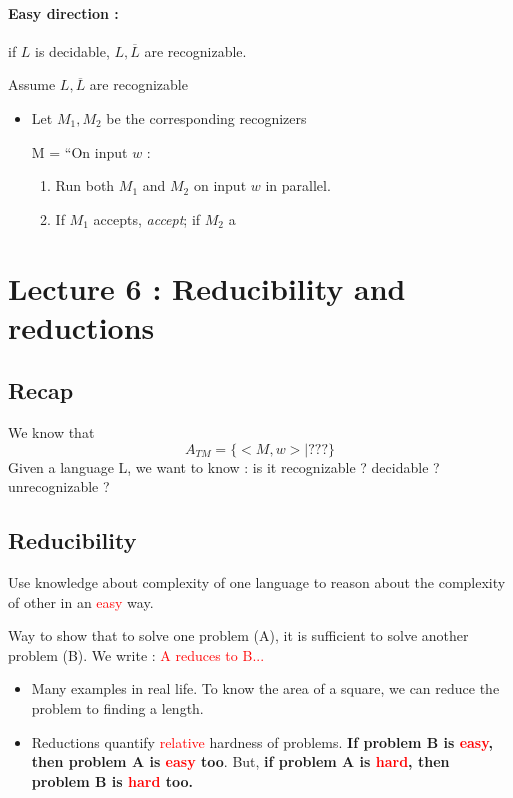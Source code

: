\documentclass[12pt,a4paper]{article}
\newcommand{\<}{\langle}
\renewcommand{\>}{\rangle}
\begin{document}
\paragraph{Easy direction :} if $L$ is decidable, $L,\overline{L}$ are recognizable.

Assume $L, \overline{L}$ are recognizable
\begin{itemize}
    \item Let $M_1, M_2$ be the corresponding recognizers
            \begin{center}
                M = ``On input $w$ :
                \begin{enumerate}
                    \item Run both $M_1$ and $M_2$ on input $w$ in parallel.
                    \item If $M_1$ accepts, \textit{accept}; if $M_2$ a
\end{enumerate}
\end{center}
\end{itemize}
\section{Lecture 6 : Reducibility and reductions}
\subsection{Recap}
We know that 
\[A_{TM} = \{<M,w> |  ???\}\]
Given a language L, we want to know : is it recognizable ? decidable ? unrecognizable ?
\subsection{Reducibility}
\begin{boite}
     Use knowledge about complexity of one language to reason about the complexity of other in an \textcolor{red}{easy} way.
\end{boite}
\begin{boite}
     Way to show that to solve one problem (A), it is sufficient to solve another problem (B). We write : \textcolor{red}{A reduces to B...}
\end{boite}
\begin{itemize}
    \item Many examples in real life. To know the area of a square, we can reduce the problem to finding a length.
    \item Reductions quantify \textcolor{red}{relative} hardness of problems. \textbf{If problem B is \textcolor{red}{easy}, then problem A is \textcolor{red}{easy} too}. But, \textbf{if problem A is \textcolor{red}{hard}, then problem B is \textcolor{red}{hard} too.}
\end{itemize}
\end{document}
